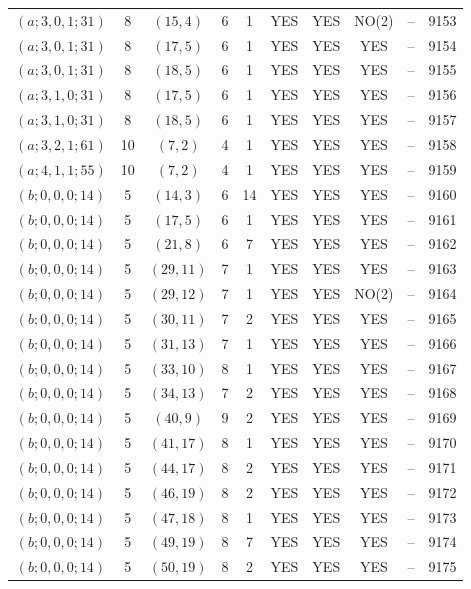 \begin{longtable}{|c|c|c|c|c|c|c|c|c|c|}
$(a; 3, 0, 1; 31)$ & 8 & $(15, 4)$ & 6 & 1 & YES & YES & NO(2) & -- & 9153\\
$(a; 3, 0, 1; 31)$ & 8 & $(17, 5)$ & 6 & 1 & YES & YES & YES & -- & 9154\\
$(a; 3, 0, 1; 31)$ & 8 & $(18, 5)$ & 6 & 1 & YES & YES & YES & -- & 9155\\
$(a; 3, 1, 0; 31)$ & 8 & $(17, 5)$ & 6 & 1 & YES & YES & YES & -- & 9156\\
$(a; 3, 1, 0; 31)$ & 8 & $(18, 5)$ & 6 & 1 & YES & YES & YES & -- & 9157\\
$(a; 3, 2, 1; 61)$ & 10 & $(7, 2)$ & 4 & 1 & YES & YES & YES & -- & 9158\\
$(a; 4, 1, 1; 55)$ & 10 & $(7, 2)$ & 4 & 1 & YES & YES & YES & -- & 9159\\
$(b; 0, 0, 0; 14)$ & 5 & $(14, 3)$ & 6 & 14 & YES & YES & YES & -- & 9160\\
$(b; 0, 0, 0; 14)$ & 5 & $(17, 5)$ & 6 & 1 & YES & YES & YES & -- & 9161\\
$(b; 0, 0, 0; 14)$ & 5 & $(21, 8)$ & 6 & 7 & YES & YES & YES & -- & 9162\\
$(b; 0, 0, 0; 14)$ & 5 & $(29, 11)$ & 7 & 1 & YES & YES & YES & -- & 9163\\
$(b; 0, 0, 0; 14)$ & 5 & $(29, 12)$ & 7 & 1 & YES & YES & NO(2) & -- & 9164\\
$(b; 0, 0, 0; 14)$ & 5 & $(30, 11)$ & 7 & 2 & YES & YES & YES & -- & 9165\\
$(b; 0, 0, 0; 14)$ & 5 & $(31, 13)$ & 7 & 1 & YES & YES & YES & -- & 9166\\
$(b; 0, 0, 0; 14)$ & 5 & $(33, 10)$ & 8 & 1 & YES & YES & YES & -- & 9167\\
$(b; 0, 0, 0; 14)$ & 5 & $(34, 13)$ & 7 & 2 & YES & YES & YES & -- & 9168\\
$(b; 0, 0, 0; 14)$ & 5 & $(40, 9)$ & 9 & 2 & YES & YES & YES & -- & 9169\\
$(b; 0, 0, 0; 14)$ & 5 & $(41, 17)$ & 8 & 1 & YES & YES & YES & -- & 9170\\
$(b; 0, 0, 0; 14)$ & 5 & $(44, 17)$ & 8 & 2 & YES & YES & YES & -- & 9171\\
$(b; 0, 0, 0; 14)$ & 5 & $(46, 19)$ & 8 & 2 & YES & YES & YES & -- & 9172\\
$(b; 0, 0, 0; 14)$ & 5 & $(47, 18)$ & 8 & 1 & YES & YES & YES & -- & 9173\\
$(b; 0, 0, 0; 14)$ & 5 & $(49, 19)$ & 8 & 7 & YES & YES & YES & -- & 9174\\
$(b; 0, 0, 0; 14)$ & 5 & $(50, 19)$ & 8 & 2 & YES & YES & YES & -- & 9175\\

\end{longtable}
